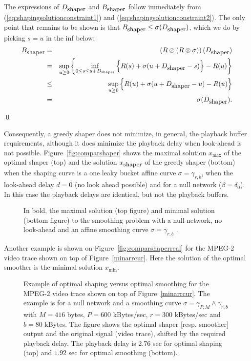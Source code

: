 \pr The expressions of $D_{\mbox{\small shaper}}$ and $B_{\mbox{\small shaper}}$ follow immediately from (\ref{eq:shapingsolutionconstraint1}) and (\ref{eq:shapingsolutionconstraint2}). The only point that remains to be shown is that $B_{\mbox{\small shaper}} \leq
\sigma(D_{\mbox{\small shaper}})$, which we do by picking $s = u$ in the inf below:
\begin{eqnarray*}
 B_{\mbox{\small shaper}}  & = & \left( R \oslash (R \otimes \sigma) \right)  (D_{\mbox{\small shaper}}) \\
 & = & \sup_{u \geq 0} \left\{ \inf_{0 \leq s \leq u + D_{\mbox{\tiny shaper}}} \left\{ R(s) + \sigma(u  + D_{\mbox{\small shaper}} - s) \right\} - R(u) \right\} \\
 & \leq & \sup_{u \geq 0} \left\{ R(u) + \sigma(u  + D_{\mbox{\small shaper}} - u) - R(u) \right\} \\
 & = &  \sigma(D_{\mbox{\small shaper}}).
\end{eqnarray*}

\qed

Consequently, a greedy shaper does not minimize, in general, the playback buffer requirements,
although it does minimize the playback delay when look-ahead is not possible.
Figure~\ref{fig:comparshaper} shows the maximal solution $x_{\max}$ of the optimal shaper (top) and the solution $x_{\mbox{\small shaper}}$ of the greedy shaper (bottom) when the shaping curve is a one leaky bucket affine curve $\sigma = \gamma_{r,b}$, when the look-ahead delay $d=0$ (no look ahead possible) and for a null network ($\beta = \delta_0$). In this case the playback delays are identical, but not the playback buffers.

\begin{figure}[h!]
\caption{In bold, the maximal solution (top figure) and minimal solution (bottom figure)
to the smoothing problem with a null network, no look-ahead and an affine smoothing curve $\sigma = \gamma_{r,b}$ .}
\protect{}
\end{figure}

Another example is shown on Figure~\ref{fig:comparshaperreal} for the MPEG-2 video trace shown on top of Figure~\ref{minarrcur}. Here the solution of the optimal smoother is the minimal solution  $x_{\min}$.

\begin{figure}[h!]
\caption{Example of optimal shaping versus optimal smoothing for the MPEG-2 video trace shown on top of Figure~\ref{minarrcur}.
  The example is for a null network and a smoothing curve $\sigma = \gamma_{P,M} \wedge \gamma_{r,b}$
  with $M= 416$ bytes,  $P=600$ kBytes/sec, $r = 300$ kBytes/sec and $b=80$ kBytes.
  The figure shows the optimal shaper [resp. smoother] output and
  the original signal (video trace), shifted by the required playback delay. The
  playback delay is $2.76$ sec for optimal shaping (top) and $1.92$ sec for optimal
  smoothing (bottom).}
\protect{}
\end{figure}

